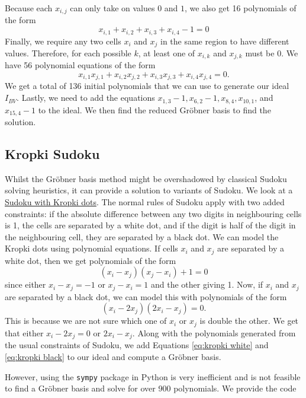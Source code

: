 \documentclass[../main.tex]{subfiles}
\begin{document}
            Because each $x_{i,j}$ can only take on values $0$ and $1$, we also get 16 polynomials of the form
            \begin{equation} \label{eq:bool sum}
                x_{i,1}+x_{i,2}+x_{i,3}+x_{i,4}-1=0
            \end{equation}
            Finally, we require any two cells $x_i$ and $x_j$ in the same region to have different values. Therefore, for each possible $k$, at least one of $x_{i,k}$ and $x_{j,k}$ must be 0. We have 56 polynomial equations of the form
            \begin{equation} \label{eq:bool prod}
                x_{i,1}x_{j,1} + x_{i,2}x_{j,2} + x_{i,3}x_{j,3} + x_{i,4}x_{j,4} = 0.
            \end{equation}
            We get a total of 136 initial polynomials that we can use to generate our ideal $I_{BV}$. Lastly, we need to add the equations $x_{1,3}-1, x_{6,2}-1, x_{8,4}, x_{10, 1}$, and $x_{15,4}-1$ to the ideal. We then find the reduced Gr\"obner basis to find the solution.

        
    \subsection{Kropki Sudoku}

    Whilst the Gr\"obner basis method might be overshadowed by classical Sudoku solving heuristics, it can provide a solution to variants of Sudoku. We look at a \href{https://www.funwithpuzzles.com/2018/02/kropki-or-dots--sudoku-puzzle.html}{Sudoku with Kropki dots}. The normal rules of Sudoku apply with two added constraints: if the absolute difference between any two digits in neighbouring cells is 1, the cells are separated by a white dot, and if the digit is half of the digit in the neighbouring cell, they are separated by a black dot. We can model the Kropki dots using polynomial equations. If cells $x_i$ and $x_j$ are separated by a white dot, then we get polynomials of the form
    \begin{equation} \label{eq:kropki white}
        (x_i-x_j)(x_j-x_i)+1=0
    \end{equation}
    since either $x_i-x_j=-1$ or $x_j-x_i=1$ and the other giving 1. Now, if $x_i$ and $x_j$ are separated by a black dot, we can model this with polynomials of the form
    \begin{equation} \label{eq:kropki black}
        (x_i-2x_j)(2x_i-x_j) = 0.
    \end{equation}
    This is because we are not sure which one of $x_i$ or $x_j$ is double the other. We get that either $x_i-2x_j=0$ or $2x_i-x_j$. Along with the polynomials generated from the usual constraints of Sudoku, we add Equations \ref{eq:kropki white} and \ref{eq:kropki black} to our ideal and compute a Gr\"obner basis.
    
    However, using the \texttt{sympy} package in Python is very inefficient and is not feasible to find a Gr\"obner basis and solve for over 900 polynomials. We provide the code 
\end{document}

